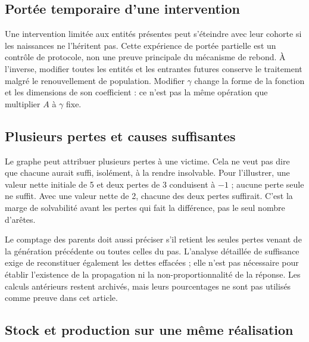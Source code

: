 \subsection{Portée temporaire d'une intervention}
Une intervention limitée aux entités présentes peut s'éteindre
avec leur cohorte si les naissances ne l'héritent pas. Cette
expérience de portée partielle est un contrôle de protocole,
non une preuve principale du mécanisme de rebond. À l'inverse,
modifier toutes les entités et les entrantes futures conserve
le traitement malgré le renouvellement de population. Modifier
$\gamma$ change la forme de la fonction et les dimensions de
son coefficient : ce n'est pas la même opération que multiplier
$A$ à $\gamma$ fixe.

\subsection{Plusieurs pertes et causes suffisantes}
Le graphe peut attribuer plusieurs pertes à une victime.
Cela ne veut pas dire que chacune aurait suffi, isolément, à
la rendre insolvable. Pour l'illustrer, une valeur nette initiale
de 5 et deux pertes de 3 conduisent à $-1$ ; aucune perte seule
ne suffit. Avec une valeur nette de 2, chacune des deux pertes
suffirait. C'est la marge de solvabilité avant les pertes qui
fait la différence, pas le seul nombre d'arêtes.

Le comptage des parents doit aussi préciser s'il retient les
seules pertes venant de la génération précédente ou toutes
celles du pas. L'analyse détaillée de suffisance exige de
reconstituer également les dettes effacées ; elle n'est pas
nécessaire pour établir l'existence de la propagation ni la
non-proportionnalité de la réponse. Les calculs antérieurs
restent archivés, mais leurs pourcentages ne sont pas utilisés
comme preuve dans cet article.

\subsection{Stock et production sur une même réalisation}

\FloatBarrier
